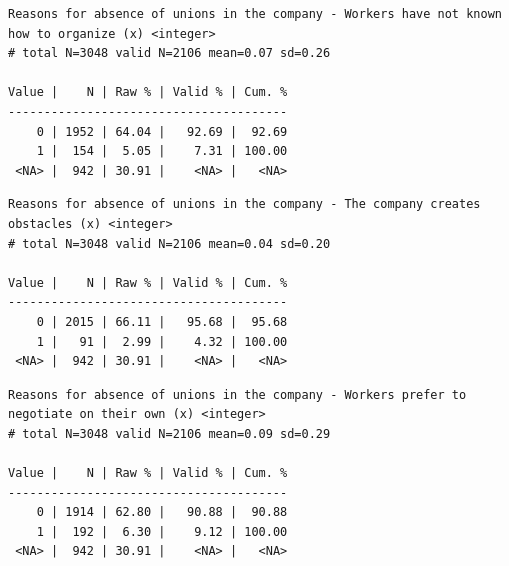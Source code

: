 \documentclass[
  letterpaper,
  DIV=11,
  numbers=noendperiod]{scrreprt}
\newenvironment{Shaded}{\begin{snugshade}}{\end{snugshade}}
\newcommand{\FunctionTok}[1]{\textcolor[rgb]{0.28,0.35,0.67}{#1}}
\newcommand{\NormalTok}[1]{\textcolor[rgb]{0.00,0.23,0.31}{#1}}
\newcommand{\SpecialCharTok}[1]{\textcolor[rgb]{0.37,0.37,0.37}{#1}}
\begin{document}
\begin{Shaded}
\end{Shaded}

\begin{verbatim}
Reasons for absence of unions in the company - Workers have not known how to organize (x) <integer> 
# total N=3048 valid N=2106 mean=0.07 sd=0.26

Value |    N | Raw % | Valid % | Cum. %
---------------------------------------
    0 | 1952 | 64.04 |   92.69 |  92.69
    1 |  154 |  5.05 |    7.31 | 100.00
 <NA> |  942 | 30.91 |    <NA> |   <NA>
\end{verbatim}

\begin{Shaded}
\end{Shaded}

\begin{verbatim}
Reasons for absence of unions in the company - The company creates obstacles (x) <integer> 
# total N=3048 valid N=2106 mean=0.04 sd=0.20

Value |    N | Raw % | Valid % | Cum. %
---------------------------------------
    0 | 2015 | 66.11 |   95.68 |  95.68
    1 |   91 |  2.99 |    4.32 | 100.00
 <NA> |  942 | 30.91 |    <NA> |   <NA>
\end{verbatim}

\begin{Shaded}
\end{Shaded}

\begin{verbatim}
Reasons for absence of unions in the company - Workers prefer to negotiate on their own (x) <integer> 
# total N=3048 valid N=2106 mean=0.09 sd=0.29

Value |    N | Raw % | Valid % | Cum. %
---------------------------------------
    0 | 1914 | 62.80 |   90.88 |  90.88
    1 |  192 |  6.30 |    9.12 | 100.00
 <NA> |  942 | 30.91 |    <NA> |   <NA>
\end{verbatim}
\end{document}
